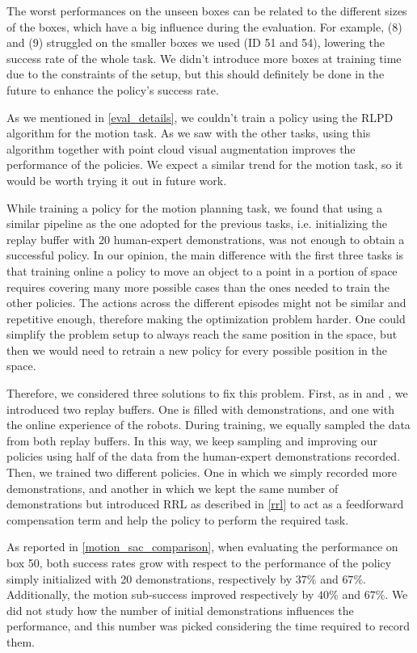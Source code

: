 \documentclass[letterpaper, 10 pt, conference]{ieeeconf}  %
\begin{document}
The worst performances on the unseen boxes can be related to the different sizes of the boxes, which have a big influence during the evaluation. For example, (8) and (9) struggled on the smaller boxes we used (ID 51 and 54), lowering the success rate of the whole task.
We didn't introduce more boxes at training time due to the constraints of the setup, but this should definitely be done in the future to enhance the policy's success rate.

As we mentioned in \cref{eval_details}, we couldn't train a policy using the RLPD algorithm for the motion task. As we saw with the other tasks, using this algorithm together with point cloud visual augmentation improves the performance of the policies. We expect a similar trend for the motion task, so it would be worth trying it out in future work.

While training a policy for the motion planning task, we found that using a similar pipeline as the one adopted for the previous tasks, i.e. initializing the replay buffer with 20 human-expert demonstrations, was not enough to obtain a successful policy.
In our opinion, the main difference with the first three tasks is that training online a policy to move an object to a point in a portion of space requires covering many more possible cases than the ones needed to train the other policies. 
The actions across the different episodes might not be similar and repetitive enough, therefore making the optimization problem harder. One could simplify the problem setup to always reach the same position in the space, but then we would need to retrain a new policy for every possible position in the space.

Therefore, we considered three solutions to fix this problem. First, as in \cite{luo2024precisedexterousroboticmanipulation} and \cite{nair2018overcomingexplorationreinforcementlearning}, we introduced two replay buffers. One is filled with demonstrations, and one with the online experience of the robots.  
During training, we equally sampled the data from both replay buffers.
In this way, we keep sampling and improving our policies using half of the data from the human-expert demonstrations recorded. 
Then, we trained two different policies. One in which we simply recorded more demonstrations, and another in which we kept the same number of demonstrations but introduced RRL as described in \cref{rrl} to act as a feedforward compensation term and help the policy to perform the required task. 

As reported in \cref{motion_sac_comparison}, when evaluating the performance on box 50, both success rates grow with respect to the performance of the policy simply initialized with 20 demonstrations, respectively by $37\%$ and $67\%$. Additionally, the motion sub-success improved respectively by $40\%$ and $67\%$. We did not study how the number of initial demonstrations influences the performance, and this number was picked considering the time required to record them.
\end{document}
